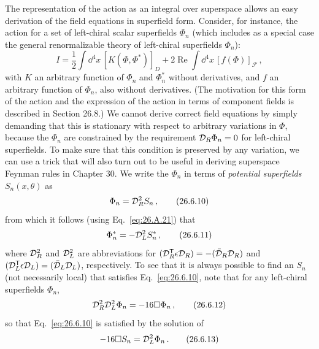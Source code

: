 The representation of the action as an integral over superspace allows an
easy derivation of the field equations in superfield form. Consider, for
instance, the action for a set of left-chiral scalar superfields \(\Phi_n\)
(which includes as a special case the general renormalizable theory of
left-chiral superfields \(\Phi_n\)):
\begin{equation}
  I
  =\frac12\int \dd^4x\,[K(\Phi,\Phi^*)]_D
   +2\operatorname{Re}\int \dd^4x\,[f(\Phi)]_{\mathcal{F}}\,,
  \tag{26.6.9}\label{eq:26.6.9}
\end{equation}
with \(K\) an arbitrary function of \(\Phi_n\) and \(\Phi_n^*\) without
derivatives, and \(f\) an arbitrary function of \(\Phi_n\), also without
derivatives. (The motivation for this form of the action and the expression of
the action in terms of component fields is described in Section 26.8.) We
cannot derive correct field equations by simply demanding that this is
stationary with respect to arbitrary variations in \(\Phi\), because the
\(\Phi_n\) are constrained by the requirement
\(\mathcal{D}_R\Phi_n=0\) for left-chiral superfields. To make sure
that this condition is preserved by any variation, we can use a trick that
will also turn out to be useful in deriving superspace Feynman rules in
Chapter 30. We write the \(\Phi_n\) in terms of \emph{potential superfields}
\(S_n(x,\theta)\) as
\begin{equation}
  \Phi_n=\mathcal{D}_R^2S_n\,,
  \tag{26.6.10}\label{eq:26.6.10}
\end{equation}
from which it follows (using Eq.~\eqref{eq:26.A.21}) that
\begin{equation}
  \Phi_n^*=-\mathcal{D}_L^2S_n^*\,,
  \tag{26.6.11}\label{eq:26.6.11}
\end{equation}
where \(\mathcal{D}_R^2\) and \(\mathcal{D}_L^2\) are abbreviations for
\((\mathcal{D}_R^{\mathsf T}\epsilon\mathcal{D}_R)=-(\bar{\mathcal{D}}_R\mathcal{D}_R)\) and
\((\mathcal{D}_L^{\mathsf T}\epsilon\mathcal{D}_L)=(\bar{\mathcal{D}}_L\mathcal{D}_L)\), respectively.
To see that it is always possible to find an \(S_n\) (not necessarily local)
that satisfies Eq.~\eqref{eq:26.6.10}, note that for any left-chiral
superfields \(\Phi_n\),
\begin{equation}
  \mathcal{D}_R^2\mathcal{D}_L^2\Phi_n=-16\Box\Phi_n\,,
  \tag{26.6.12}\label{eq:26.6.12}
\end{equation}
so that Eq.~\eqref{eq:26.6.10} is satisfied by the solution of
\begin{equation}
  -16\Box S_n=\mathcal{D}_L^2\Phi_n\,.
  \tag{26.6.13}\label{eq:26.6.13}
\end{equation}

